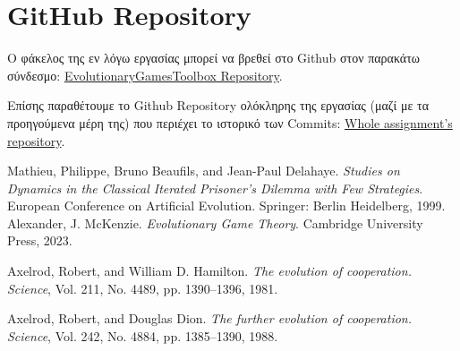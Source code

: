 \documentclass[12pt]{report}
\begin{document}
\section{\foreignlanguage{english}{GitHub Repository}}
Ο φάκελος της εν λόγω εργασίας μπορεί να βρεθεί στο \foreignlanguage{english}{Github} στον παρακάτω σύνδεσμο: \newline
\foreignlanguage{english}{
\href{https://github.com/geogkioul/EvolutionaryGamesToolbox.git}{EvolutionaryGamesToolbox Repository}.
}

Επίσης παραθέτουμε το \foreignlanguage{english}{Github Repository} ολόκληρης της εργασίας (μαζί με τα προηγούμενα μέρη της) που περιέχει το ιστορικό των \foreignlanguage{english}{Commits}: \newline
\foreignlanguage{english}{
\href{https://github.com/geogkioul/Game-Theory-Course-Assignment.git}{Whole assignment's repository}.
}

\begin{thebibliography}{9}
Mathieu, Philippe, Bruno Beaufils, and Jean-Paul Delahaye. 
\textit{Studies on Dynamics in the Classical Iterated Prisoner’s Dilemma with Few Strategies}. 
European Conference on Artificial Evolution. Springer: Berlin Heidelberg, 1999.
Alexander, J. McKenzie.
\textit{Evolutionary Game Theory}. Cambridge University Press, 2023.

Axelrod, Robert, and William D. Hamilton.
\textit{The evolution of cooperation.}
\textit{Science}, Vol. 211, No. 4489, pp. 1390--1396, 1981.

Axelrod, Robert, and Douglas Dion.
\textit{The further evolution of cooperation.}
\textit{Science}, Vol. 242, No. 4884, pp. 1385--1390, 1988.
\end{thebibliography}
\end{document}
